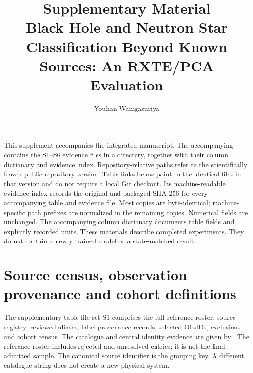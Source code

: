 \documentclass[final,5p,authoryear,nopreprintline]{elsarticle}
\begin{document}
\begin{frontmatter}
\title{Supplementary Material\\[0.5em]\large Black Hole and Neutron Star Classification Beyond Known Sources: An RXTE/PCA Evaluation}
\author[colombo]{Youhan Wanigasuriya}
\address[colombo]{Department of Chemistry, Faculty of Science, University of Colombo,
PO Box 1490, University of Colombo, Colombo 00300, Sri Lanka}

\end{frontmatter}
\thispagestyle{plain}
\renewcommand{\thesection}{S\arabic{section}}
\renewcommand{\thefigure}{S\arabic{figure}}
\renewcommand{\thetable}{S\arabic{table}}


This supplement accompanies the integrated manuscript. The accompanying  contains the S1--S6 evidence files in a  directory, together with their column dictionary and evidence index. Repository-relative paths refer to the \href{https://github.com/YouhanCW/bhns-source-generalization/tree/3c5bb50b1820ef89f816fc2f4da0fb6c69f359f7}{scientifically frozen public repository version}. Table links below point to the identical files in that version and do not require a local Git checkout. Its machine-readable evidence index records the original and packaged SHA-256 for every accompanying table and evidence file. Most copies are byte-identical; machine-specific path prefixes are normalized in the remaining copies. Numerical fields are unchanged. The accompanying \href{https://github.com/YouhanCW/bhns-source-generalization/blob/3c5bb50b1820ef89f816fc2f4da0fb6c69f359f7/manuscript/supplement/tables/column_dictionary.csv}{column dictionary} documents table fields and explicitly recorded units. These materials describe completed experiments. They do not contain a newly trained model or a state-matched result.

\section{Source census, observation provenance and cohort definitions}

The supplementary table-file set S1 comprises the full reference roster, source registry, reviewed aliases, label-provenance records, selected ObsIDs, exclusions and cohort census. The catalogue and central identity evidence are given by \citep{CorralSantana2016,Galloway2020,Orosz2001,Sanna2018}. The reference roster includes rejected and unresolved entries; it is not the final admitted sample. The canonical source identifier is the grouping key. A different catalogue string does not create a new physical system.
\end{document}
